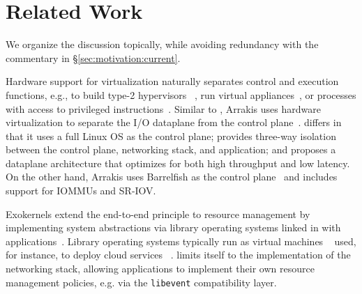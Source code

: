 

\section{Related Work}
\label{sec:related}

We organize the discussion topically, while avoiding redundancy with
the commentary in \S\ref{sec:motivation:current}.

 Hardware support for
virtualization naturally separates control and execution functions,
e.g., to build type-2 hypervisors
~\cite{DBLP:journals/tocs/BugnionDRSW12,misc/kivity07kvm}, run virtual
appliances~\cite{DBLP:conf/lisa/SapuntzakisBCZCLR03}, or processes
with access to privileged instructions~\cite{dune}. Similar to \ix,
Arrakis uses hardware virtualization to separate the I/O dataplane
from the control plane~\cite{arrakis-osdi}. \ix differs in that it
uses a full Linux OS as the control plane; provides three-way
isolation between the control plane, networking stack, and
application; and proposes a dataplane architecture that optimizes for
both high throughput and low latency. On the other hand, Arrakis uses
Barrelfish as the control
plane~\cite{DBLP:conf/sosp/BaumannBDHIPRSS09} and includes support for
IOMMUs and SR-IOV.

 Exokernels extend the
end-to-end principle to resource management by implementing system
abstractions via library operating systems linked in with
applications~\cite{DBLP:conf/sosp/EnglerKO95}.  Library operating
systems typically run as virtual machines
~\cite{DBLP:journals/tocs/BugnionDGR97} used, for instance, to deploy
cloud services ~\cite{DBLP:conf/asplos/MadhavapeddyMRSSGSHC13}. \ix
limits itself to the implementation of the networking stack, allowing
applications to implement their own resource management policies,
e.g. via the \texttt{libevent} compatibility layer.


